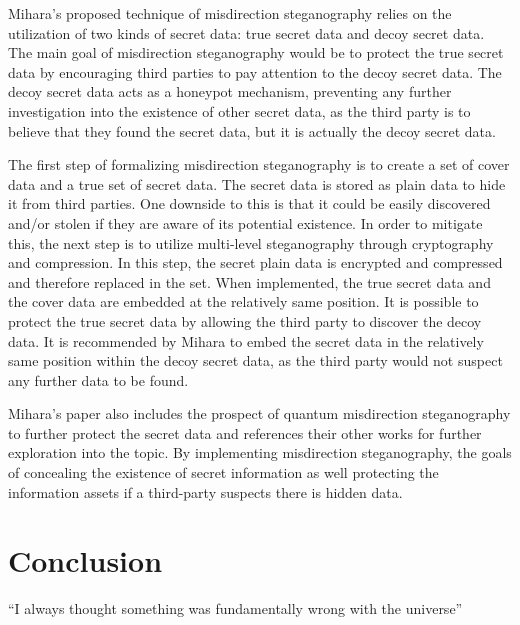 \documentclass{article}
\begin{document}
Mihara’s proposed technique of misdirection steganography relies on the utilization of two kinds of secret data: true secret data and decoy secret data. The main goal of misdirection steganography would be to protect the true secret data by encouraging third parties to pay attention to the decoy secret data. The decoy secret data acts as a honeypot mechanism, preventing any further investigation into the existence of other secret data, as the third party is to believe that they found the secret data, but it is actually the decoy secret data.

The first step of formalizing misdirection steganography is to create a set of cover data and a true set of secret data. The secret data is stored as plain data to hide it from third parties. One downside to this is that it could be easily discovered and/or stolen if they are aware of its potential existence. In order to mitigate this, the next step is to utilize multi-level steganography through cryptography and compression. In this step, the secret plain data is encrypted and compressed and therefore replaced in the set. When implemented, the true secret data and the cover data are embedded at the relatively same position. It is possible to protect the true secret data by allowing the third party to discover the decoy data. It is recommended by Mihara to embed the secret data in the relatively same position within the decoy secret data, as the third party would not suspect any further data to be found. 

Mihara’s paper also includes the prospect of quantum misdirection steganography to further protect the secret data and references their other works for further exploration into the topic. By implementing misdirection steganography, the goals of concealing the existence of secret information as well protecting the information assets if a third-party suspects there is hidden data.

\section{Conclusion}
``I always thought something was fundamentally wrong with the universe'' \citep{adams1995hitchhiker}



\end{document}
